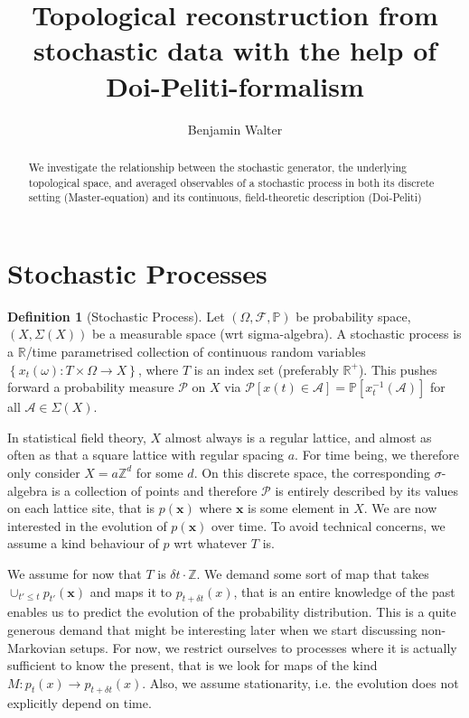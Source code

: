 \documentclass[10pt,a4paper]{article}
\title{Topological reconstruction from stochastic data with the help of Doi-Peliti-formalism}
\author{Benjamin Walter}
\theoremstyle{definition}
\newtheorem{definition}{Definition}
\theoremstyle{plain}
\begin{document}
\maketitle 
\begin{abstract}
We investigate the relationship between the stochastic generator, the underlying topological space, and averaged observables of a stochastic process in both its discrete setting (Master-equation) and its continuous, field-theoretic description (Doi-Peliti)
\end{abstract}

\section{Stochastic Processes}
\begin{definition}[Stochastic Process]
	Let $(\Omega, \mathcal{F}, \mathbb{P})$ be probability space, $(X, \Sigma(X))$ be a measurable space (wrt sigma-algebra). A stochastic process is a $\mathbb{R}$/time parametrised collection of continuous random variables $\left\{ x_t(\omega) : T\times \Omega \to X \right\}$, where $T$ is an index set (preferably $\mathbb{R}^+$). This pushes forward a probability measure $\mathcal{P}$ on $X$ via $\mathcal{P}\left[ x(t) \in \mathcal{A} \right] = \mathbb{P}\left[ x^{-1}_t(\mathcal{A}) \right]$ for all $\mathcal{A} \in \Sigma(X)$.
\end{definition}

In statistical field theory, $X$ almost always is a regular lattice, and almost as often as that a square lattice with regular spacing $a$. For time being, we therefore only consider $X=a \mathbb{Z}^d$ for some $d$. On this discrete space, the corresponding $\sigma$-algebra is a collection of points and therefore $\mathcal{P}$ is entirely described by its values on each lattice site, that is $p(\mathbf{x})$ where $\mathbf{x}$ is some element in $X$. We are now interested in the evolution of $p(\mathbf{x})$ over time. To avoid technical concerns, we assume a kind behaviour of $p$ wrt whatever $T$ is.

We assume for now that $T$ is $\delta t \cdot \mathbb{Z}$. We demand some sort of map that takes $\cup_{t'\leq t} p_{t'}(\mathbf{x})$ and maps it to $p_{t+\delta t}(x)$, that is an entire knowledge of the past enables us to predict the evolution of the probability distribution. This is a quite generous demand that might be interesting later when we start discussing non-Markovian setups. For now, we restrict ourselves to processes where it is actually sufficient to know the present, that is we look for maps of the kind $M: p_t(x) \to p_{t+\delta t}(x)$. Also, we assume stationarity, i.e. the evolution does not explicitly depend on time.
\end{document}
